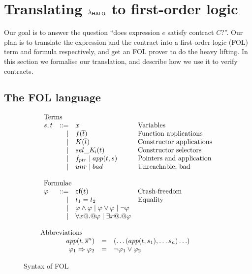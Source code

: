 \section{Translating $\lambda_{\sf HALO}$ to first-order logic} \label{ssect:trans-fol}

Our goal is to answer the question ``does expression $e$ satisfy
contract $C$?''.  Our plan is to translate the expression and the
contract into a first-order logic (FOL) term and formula respectively, and get an 
FOL prover to do the heavy lifting. In this section we formalise our translation, 
and describe how we use it to verify contracts.

\subsection{The FOL language}

\begin{figure}
\[\begin{array}{c}
\begin{array}{lrll}
\multicolumn{3}{l}{\text{Terms}} \\
  s,t & ::=  & x                          & \text{Variables} \\
      & \mid & f(\ol{t})                  & \text{Function applications} \\
      & \mid & K(\ol{t})                  & \text{Constructor applications} \\
      & \mid & \sel{K}{i}(t)              & \text{Constructor selectors} \\
      & \mid & f_{ptr} \mid app(t,s)       & \text{Pointers and application} \\
      & \mid & \unr \mid \bad             & \text{Unreachable, bad} \\ \\
\multicolumn{3}{l}{\text{Formulae}} \\
 \phi & ::=  & \lcf{t}    & \text{Crash-freedom} \\
      & \mid & t_1 = t_2  & \text{Equality} \\
      & \mid & \phi \land \phi \mid \phi \lor \phi \mid \neg \phi \\
      & \mid & \forall x @.@ \phi \mid \exists x @.@ \phi \\ \\
\end{array}
\\
\multicolumn{1}{l}{\text{Abbreviations}} \\
\begin{array}{rcl}
app(t,\oln{s}{n}) & = & (\ldots(app(t,s_1),\ldots s_n)\ldots) \\
\phi_1 \Rightarrow \phi_2 & = & \neg \phi_1 \lor \phi_2
\end{array}
\end{array}\]
\caption{Syntax of FOL}\label{fig:fol-image}
\end{figure}

